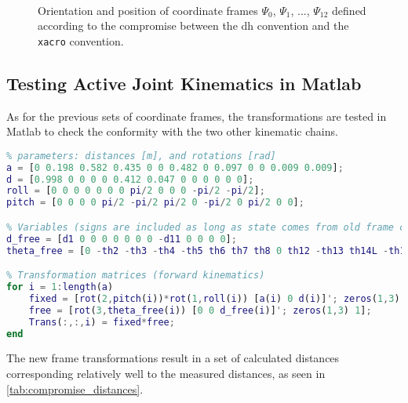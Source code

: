 \begin{figure}[htbp]
	\vspace*{-10mm}
	\hspace{-10mm}
	\vspace{5mm}\\
	\hspace*{-15mm}
	\caption{Orientation and position of coordinate frames $\Psi_0$, $\Psi_1$, ..., $\Psi_{12}$ defined according to the compromise between the \gls{dh} convention and the \texttt{xacro} convention.}
	\label{fig:robot_compromise_frames}
\end{figure}

\subsection{Testing Active Joint Kinematics in Matlab}
As for the previous sets of coordinate frames, the transformations are tested in Matlab to check the conformity with the two other kinematic chains.

\begin{lstlisting}[language=matlab]
%% Coordinate frames defined as a compromise between DH and the xacro syntax, excluding passive joints
% parameters: distances [m], and rotations [rad]
a = [0 0.198 0.582 0.435 0 0 0.482 0 0.097 0 0 0.009 0.009];
d = [0.998 0 0 0 0 0.412 0.047 0 0 0 0 0 0];
roll = [0 0 0 0 0 0 0 pi/2 0 0 0 -pi/2 -pi/2];
pitch = [0 0 0 0 pi/2 -pi/2 pi/2 0 -pi/2 0 pi/2 0 0];

% Variables (signs are included as long as state comes from old frame convention)
d_free = [d1 0 0 0 0 0 0 0 -d11 0 0 0 0];
theta_free = [0 -th2 -th3 -th4 -th5 th6 th7 th8 0 th12 -th13 th14L -th14R];

% Transformation matrices (forward kinematics)
for i = 1:length(a)
	fixed = [rot(2,pitch(i))*rot(1,roll(i)) [a(i) 0 d(i)]'; zeros(1,3) 1];
	free = [rot(3,theta_free(i)) [0 0 d_free(i)]'; zeros(1,3) 1];
	Trans(:,:,i) = fixed*free;
end
\end{lstlisting}

The new frame transformations result in a set of calculated distances corresponding relatively well to the measured distances, as seen in \autoref{tab:compromise_distances}.

